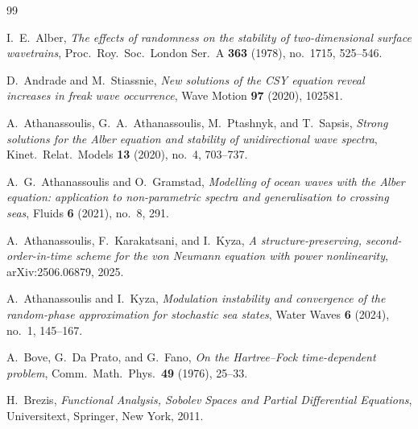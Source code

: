 \documentclass[11pt]{amsart}
\theoremstyle{definition}
\begin{document}
\begin{thebibliography}{99}

I.~E.~Alber, \emph{The effects of randomness on the stability of two-dimensional surface wavetrains}, Proc.\ Roy.\ Soc.\ London Ser.~A \textbf{363} (1978), no.~1715, 525--546.

D.~Andrade and M.~Stiassnie, \emph{New solutions of the CSY equation reveal increases in freak wave occurrence}, Wave Motion \textbf{97} (2020), 102581.

A.~Athanassoulis, G.~A.~Athanassoulis, M.~Ptashnyk, and T.~Sapsis, \emph{Strong solutions for the Alber equation and stability of unidirectional wave spectra}, Kinet.\ Relat.\ Models \textbf{13} (2020), no.~4, 703--737.

A.~G.~Athanassoulis and O.~Gramstad, \emph{Modelling of ocean waves with the Alber equation: application to non-parametric spectra and generalisation to crossing seas}, Fluids \textbf{6} (2021), no.~8, 291.

A.~Athanassoulis, F.~Karakatsani, and I.~Kyza, \emph{A structure-preserving, second-order-in-time scheme for the von Neumann equation with power nonlinearity}, arXiv:2506.06879, 2025.

A.~Athanassoulis and I.~Kyza, \emph{Modulation instability and convergence of the random-phase approximation for stochastic sea states}, Water Waves \textbf{6} (2024), no.~1, 145--167.


A.~Bove, G.~Da Prato, and G.~Fano, \emph{On the Hartree--Fock time-dependent problem}, Comm.\ Math.\ Phys.\ \textbf{49} (1976), 25--33.

H.~Brezis, \emph{Functional Analysis, Sobolev Spaces and Partial Differential Equations}, Universitext, Springer, New York, 2011.




\end{thebibliography}
\end{document}
